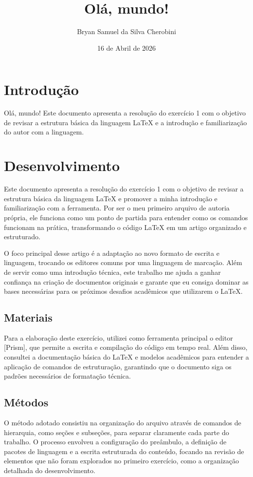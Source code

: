 \documentclass{article}
\title{Olá, mundo!}
\author{Bryan Samuel da Silva Cherobini}
\date{16 de Abril de 2026}
\begin{document}
\maketitle

\section{Introdução}


Olá, mundo!
Este documento apresenta a resolução do exercício 1 com o objetivo de revisar a estrutura básica da linguagem LaTeX e a introdução e familiarização do autor com a linguagem.

\section{Desenvolvimento}

Este documento apresenta a resolução do exercício 1 com o objetivo de revisar a estrutura básica da linguagem LaTeX e promover a minha introdução e familiarização com a ferramenta. Por ser o meu primeiro arquivo de autoria própria, ele funciona como um ponto de partida para entender como os comandos funcionam na prática, transformando o código LaTeX em um artigo organizado e estruturado.

O foco principal desse artigo é a adaptação ao novo formato de escrita e linguagem, trocando os editores comuns por uma linguagem de marcação. Além de servir como uma introdução técnica, este trabalho me ajuda a ganhar confiança na criação de documentos originais e garante que eu consiga dominar as bases necessárias para os próximos desafios acadêmicos que utilizarem o LaTeX.

    \subsection{Materiais}
    Para a elaboração deste exercício, utilizei como ferramenta principal o editor [Prism], que permite a escrita e compilação do código em tempo real. Além disso, consultei a documentação básica do LaTeX e modelos acadêmicos para entender a aplicação de comandos de estruturação, garantindo que o documento siga os padrões necessários de formatação técnica.

    \subsection{Métodos}
    O método adotado consistiu na organização do arquivo através de comandos de hierarquia, como seções e subseções, para separar claramente cada parte do trabalho. O processo envolveu a configuração do preâmbulo, a definição de pacotes de linguagem e a escrita estruturada do conteúdo, focando na revisão de elementos que não foram explorados no primeiro exercício, como a organização detalhada do desenvolvimento.
\end{document}
